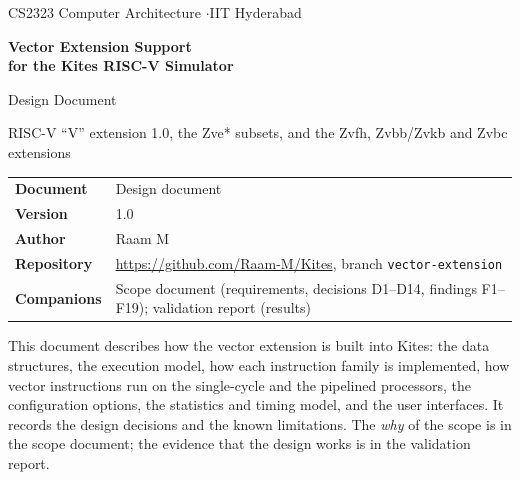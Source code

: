 \documentclass[11pt]{article}
\begin{document}
\begin{titlepage}
\thispagestyle{empty}
\vspace*{1.2cm}
{\sffamily\small\color{kgrey} CS2323 Computer Architecture \quad$\cdot$\quad IIT Hyderabad}\par
\vspace{0.6cm}
{\sffamily\bfseries\fontsize{26}{31}\selectfont\color{kblue} Vector Extension Support\\[2pt] for the Kites RISC-V Simulator\par}
\vspace{0.5cm}
{\sffamily\Large\color{kteal} Design Document\par}
\vspace{0.2cm}
{\large RISC-V ``V'' extension 1.0, the Zve* subsets, and the Zvfh, Zvbb/Zvkb and Zvbc extensions\par}
\vspace{1.4cm}

\begin{tabularx}{\textwidth}{@{}L{3.6cm}Y@{}}
\toprule
\textsf{\textbf{Document}}   & Design document \\
\textsf{\textbf{Version}}    & 1.0 \\
\textsf{\textbf{Author}}     & Raam M \\
\textsf{\textbf{Repository}} & \url{https://github.com/Raam-M/Kites}, branch \texttt{vector-extension} \\
\textsf{\textbf{Companions}} & Scope document (requirements, decisions D1--D14, findings F1--F19); validation report (results) \\
\bottomrule
\end{tabularx}

\vspace{1.0cm}
\begin{keybox}[title=Purpose of this document]
This document describes how the vector extension is built into Kites: the data structures, the
execution model, how each instruction family is implemented, how vector instructions run on the
single-cycle and the pipelined processors, the configuration options, the statistics and timing
model, and the user interfaces. It records the design decisions and the known limitations. The
\emph{why} of the scope is in the scope document; the evidence that the design works is in the
validation report.
\end{keybox}
\vfill
\end{titlepage}
\end{document}
